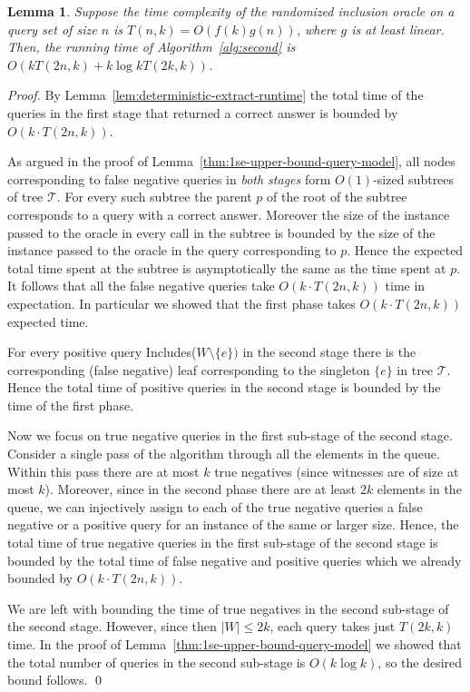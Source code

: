 \documentclass[11pt]{article}
\newtheorem{lemma}[theorem]{Lemma}
\begin{document}
\begin{lemma}
\label{lem:randomized-extract-runtime}
Suppose the time complexity of the randomized inclusion oracle on a query set of size $n$ 
is $T(n,k)=O(f(k)g(n))$, where $g$ is at least linear.
Then, the running time of Algorithm~\ref{alg:second}
is $O(k T(2n,k)+k\log k T(2k,k))$.
\end{lemma}

\begin{proof}
 By Lemma~\ref{lem:deterministic-extract-runtime} the total time of the queries in the first stage that returned a correct answer is bounded by $O(k\cdot T(2n,k))$. 
 
 As argued in the proof of Lemma~\ref{thm:1se-upper-bound-query-model}, all nodes corresponding to false negative queries in {\em both stages} form $O(1)$-sized subtrees of tree $\mathcal{T}$. For every such subtree the parent $p$ of the root of the subtree corresponds to a query with a correct answer. Moreover the size of the instance passed to the oracle in every call in the subtree is bounded by the size of the instance passed to the oracle in the query corresponding to $p$. Hence the expected total time spent at the subtree is asymptotically the same as the time spent at $p$. It follows that all the false negative queries take $O(k\cdot T(2n,k))$ time in expectation. In particular we showed that the first phase takes $O(k\cdot T(2n,k))$ expected time.
 
 For every positive query {\sc Includes}($W\setminus\{e\})$ in the second stage there is the corresponding (false negative) leaf corresponding to the singleton $\{e\}$ in tree $\mathcal{T}$. Hence the total time of positive queries in the second stage is bounded by the time of the first phase.
 
 Now we focus on true negative queries in the first sub-stage of the second stage. Consider a single pass of the algorithm through all the elements in the queue.
 Within this pass there are at most $k$ true negatives (since witnesses are of size at most $k$). Moreover, since in the second phase there are at least $2k$ elements in the queue, we can injectively assign to each of the true negative queries a false negative or a positive query for an instance of the same or larger size. Hence, the total time of true negative queries in the first sub-stage of the second stage is bounded by the total time of 
  false negative and positive queries which we already bounded by $O(k\cdot T(2n,k))$.
 
 We are left with bounding the time of true negatives in the second sub-stage of the second stage. However, since then $|W|\le 2k$, each query takes just $T(2k,k)$ time. In the proof of Lemma~\ref{thm:1se-upper-bound-query-model} we showed that the total number of queries in the second sub-stage is $O(k\log k)$, so the desired bound follows. \qed
 \end{proof}
\end{document}
